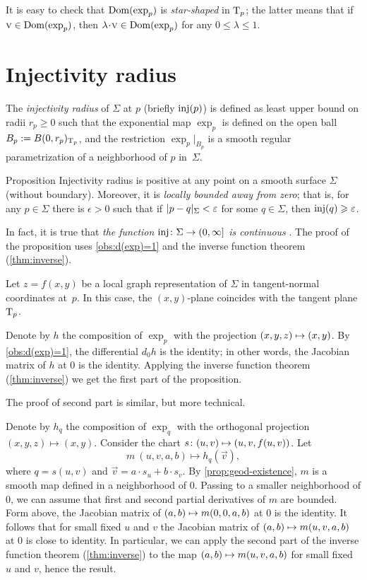It is easy to check that $\mathop{\rm Dom}\nolimits(\exp_p)$ is \emph{star-shaped} in $\mathrm{T}_p$;
the latter means that if $\text{\sc{v}}\in \mathop{\rm Dom}\nolimits(\exp_p)$, then $\lambda\cdot\vec v\in \Dom(\exp_p)$ for any $0\le \lambda\le 1$.

\section{Injectivity radius}

The \emph{injectivity radius} of $\Sigma$ at $p$ (briefly $\mathop{\rm inj}\nolimits(p)$) is defined as least upper bound on radii $r_p\ge0$ such that the exponential map $\exp_p$ is defined on the open ball $B_p\mathrel{:=} B(0,r_p)_{\mathrm{T}_p}$,
and the restriction $\exp_p|_{B_p}$ is a smooth regular parametrization of a neighborhood of $p$ in~$\Sigma$.


\begin{thm}{Proposition}\label{prop:exp}
Injectivity radius is positive at any point on a smooth surface $\Sigma$ (without boundary).
Moreover, it is {}\emph{locally bounded away from zero};
that is, for any $p\in\Sigma$ there is $\epsilon>0$ such that if $\dist{p}{q}\Sigma<\epsilon$ for some $q\in \Sigma$, then $\mathop{\rm inj}\nolimits(q)\geqslant\varepsilon$.
\end{thm}

In fact, it is true that \textit{the function $\mathop{\rm inj}\nolimits\colon\Sigma\to (0,\infty]$ is continuous} \cite[5.4]{gromoll-klingenberg-meyer}.
The proof of the proposition uses \ref{obs:d(exp)=1} and the inverse function theorem (\ref{thm:inverse}).

Let $z=f(x,y)$ be a local graph representation of $\Sigma$ in tangent-normal coordinates at~$p$.
In this case, the $(x,y)$-plane coincides with the tangent plane $\mathrm{T}_p$.

Denote by $h$ the composition of $\exp_p$ with the projection $(x,y,z)\z\mapsto (x,y)$.
By \ref{obs:d(exp)=1}, the differential $d_0h$ is the identity;
in other words, the Jacobian matrix of $h$ at $0$ is the identity.
Applying the inverse function theorem (\ref{thm:inverse}) we get the first part of the proposition.

The proof of second part is similar, but more technical.

Denote by $h_q$ the composition of $\exp_q$ with the orthogonal projection $(x,y,z)\mapsto (x,y)$.
Consider the chart $s\:(u,v)\z\mapsto (u,v,f(u,v))$.
Let
\[m\:(u,v,a,b)\mapsto h_q(\vec v),\]
where $q=s(u,v)$ and $\vec v=a\cdot s_u+b\cdot s_v$.
By \ref{prop:geod-existence}, $m$ is a smooth map defined in a neighborhood of $0$.
Passing to a smaller neighborhood of $0$, we can assume that first and second partial derivatives of $m$ are bounded.
Form above, the Jacobian matrix of $(a,b)\z\mapsto m(0,0,a,b)$ at $0$ is the identity.
It follows that for small fixed $u$ and $v$
the Jacobian matrix of $(a,b)\z\mapsto m(u,v,a,b)$ at $0$ is close to identity.
In particular, we can apply the second part of the inverse function theorem (\ref{thm:inverse}) to
the map $(a,b)\z\mapsto m(u,v,a,b)$  for small fixed $u$ and $v$, hence the result.
\qeds


